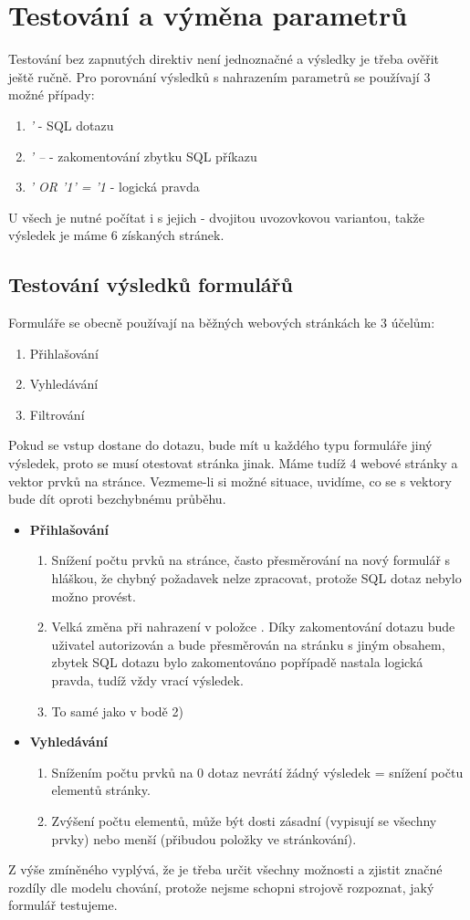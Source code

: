 \documentclass[12pt, a4paper]{report}
\begin{document}
\section{Testování a výměna parametrů}
Testování bez zapnutých direktiv není jednoznačné a výsledky je třeba ověřit ještě ručně. Pro porovnání výsledků s nahrazením parametrů se používají 3 možné případy:
\begin{enumerate}
\item \textit{'} -  SQL dotazu
\item \textit{' --} - zakomentování zbytku SQL příkazu
\item \textit{' OR '1' = '1} - logická pravda
\end{enumerate}
U všech je nutné počítat i s jejich  - dvojitou uvozovkovou variantou, takže výsledek je  máme 6 získaných stránek.

\subsection{Testování výsledků formulářů}
Formuláře se obecně používají na běžných webových stránkách ke 3 účelům:
\begin{enumerate}
\item Přihlašování
\item Vyhledávání 
\item Filtrování
\end{enumerate}
Pokud se  vstup dostane do dotazu, bude mít u každého typu formuláře jiný výsledek, proto se musí otestovat stránka jinak. Máme tudíž 4 webové stránky a vektor prvků na stránce. Vezmeme-li si možné situace, uvidíme, co se s vektory bude dít oproti bezchybnému průběhu.

\begin{itemize}
\item \textbf{Přihlašování}
\begin{enumerate}
\item Snížení počtu prvků na stránce, často přesměrování na nový formulář s hláškou, že chybný požadavek nelze zpracovat, protože SQL dotaz nebylo možno provést.
\item Velká změna při nahrazení v položce . Díky zakomentování dotazu bude uživatel autorizován a bude přesměrován na stránku s jiným obsahem, zbytek SQL dotazu bylo zakomentováno popřípadě nastala logická pravda, tudíž vždy vrací výsledek.
\item To samé jako v bodě 2)
\end{enumerate}
\item \textbf{Vyhledávání}
\begin{enumerate}
\item Snížením počtu prvků na 0 dotaz nevrátí žádný výsledek = snížení počtu elementů stránky.
\item Zvýšení počtu elementů, může být dosti zásadní (vypisují se všechny prvky) nebo menší (přibudou položky ve stránkování).
\end{enumerate}
\end{itemize}
Z výše zmíněného vyplývá, že je třeba určit všechny možnosti a zjistit značné rozdíly dle modelu chování, protože nejsme schopni strojově rozpoznat, jaký formulář testujeme.
\end{document}
